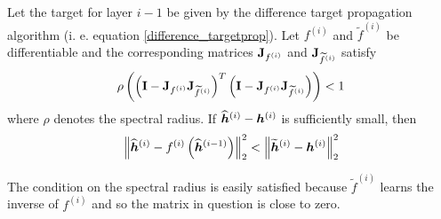 \begin{theorem}
	Let the target for layer \( i - 1 \) be given by the difference target propagation algorithm (i. e. equation \ref{difference_targetprop}). Let \( f^{(i)} \) and \( \widetilde{f}^{(i)} \) be differentiable and the corresponding matrices \( \mathbf{J}_{f^{(i)}} \) and \( \mathbf{J}_{\widetilde{f}^{(i)}} \) satisfy
	\[ \rho \left( \left( \mathbf{I} - \mathbf{J}_{f^{(i)}} \mathbf{J}_{\widetilde{f}^{(i)}} \right)^T \left( \mathbf{I} - \mathbf{J}_{f^{(i)}} \mathbf{J}_{\widetilde{f}^{(i)}} \right) \right) < 1\]
	where \( \rho \) denotes the spectral radius. If \( \widehat{\bm{h}}^{(i)} - \bm{h}^{(i)} \) is sufficiently small, then
	\[ \left\lVert \widehat{\bm{h}}^{(i)} - f^{(i)} \left( \widehat{\bm{h}}^{(i - 1)} \right) \right\rVert^2_2 < \left\lVert \widetilde{\bm{h}}^{(i)} - \bm{h}^{(i)} \right\rVert^2_2 \]
\end{theorem}
The condition on the spectral radius is easily satisfied because \( \widetilde{f}^{(i)} \) learns the inverse of \( f^{(i)} \) and so the matrix in question is close to zero.
